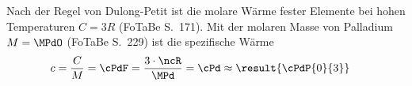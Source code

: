Nach der Regel von Dulong-Petit ist die molare Wärme fester Elemente bei hohen Temperaturen $C = 3R$ (FoTaBe S.~171). Mit der molaren Masse von Palladium $M = \MPdO$ (FoTaBe S.~229) ist die spezifische Wärme
\begin{align}
 c &= \frac{C}{M} = \cPdF = \frac{3\cdot\ncR}{\MPd} = \cPd \approx \result{\cPdP{0}{3}}
\end{align}
